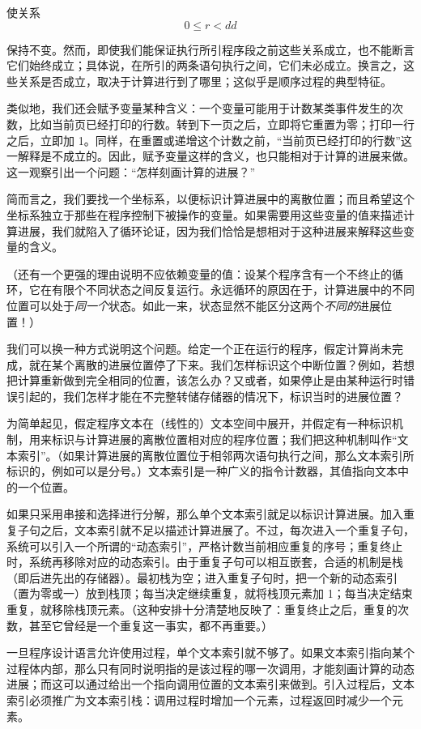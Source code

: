 \documentclass[twoside,11pt,fontset=none]{ctexbook}
\begin{document}
\noindent
使关系
$$
0 \leqslant r < dd
$$

\noindent
保持不变。然而，即使我们能保证执行所引程序段之前这些关系成立，也不能断言它们始终成立；具体说，在所引的两条语句执行之间，它们未必成立。换言之，这些关系是否成立，取决于计算进行到了哪里；这似乎是顺序过程的典型特征。

类似地，我们还会赋予变量某种含义：一个变量可能用于计数某类事件发生的次数，比如当前页已经打印的行数。转到下一页之后，立即将它重置为零；打印一行之后，立即加 1。同样，在重置或递增这个计数之前，“当前页已经打印的行数”这一解释是不成立的。因此，赋予变量这样的含义，也只能相对于计算的进展来做。这一观察引出一个问题：“怎样刻画计算的进展？”

简而言之，我们要找一个坐标系，以便标识计算进展中的离散位置；而且希望这个坐标系独立于那些在程序控制下被操作的变量。如果需要用这些变量的值来描述计算进展，我们就陷入了循环论证，因为我们恰恰是想相对于这种进展来解释这些变量的含义。

（还有一个更强的理由说明不应依赖变量的值：设某个程序含有一个不终止的循环，它在有限个不同状态之间反复运行。永远循环的原因在于，计算进展中的不同位置可以处于\textit{同一个}状态。如此一来，状态显然不能区分这两个\textit{不同的}进展位置！）

我们可以换一种方式说明这个问题。给定一个正在运行的程序，假定计算尚未完成，就在某个离散的进展位置停了下来。我们怎样标识这个中断位置？例如，若想把计算重新做到完全相同的位置，该怎么办？又或者，如果停止是由某种运行时错误引起的，我们怎样才能在不完整转储存储器的情况下，标识当时的进展位置？

为简单起见，假定程序文本在（线性的）文本空间中展开，并假定有一种标识机制，用来标识与计算进展的离散位置相对应的程序位置；我们把这种机制叫作“文本索引”。（如果计算进展的离散位置位于相邻两次语句执行之间，那么文本索引所标识的，例如可以是分号。）文本索引是一种广义的指令计数器，其值指向文本中的一个位置。

如果只采用串接和选择进行分解，那么单个文本索引就足以标识计算进展。加入重复子句之后，文本索引就不足以描述计算进展了。不过，每次进入一个重复子句，系统可以引入一个所谓的“动态索引”，严格计数当前相应重复的序号；重复终止时，系统再移除对应的动态索引。由于重复子句可以相互嵌套，合适的机制是栈（即后进先出的存储器）。最初栈为空；进入重复子句时，把一个新的动态索引（置为零或一）放到栈顶；每当决定继续重复，就将栈顶元素加 1；每当决定结束重复，就移除栈顶元素。（这种安排十分清楚地反映了：重复终止之后，重复的次数，甚至它曾经是一个重复这一事实，都不再重要。）

一旦程序设计语言允许使用过程，单个文本索引就不够了。如果文本索引指向某个过程体内部，那么只有同时说明指的是该过程的哪一次调用，才能刻画计算的动态进展；而这可以通过给出一个指向调用位置的文本索引来做到。引入过程后，文本索引必须推广为文本索引栈：调用过程时增加一个元素，过程返回时减少一个元素。
\end{document}
